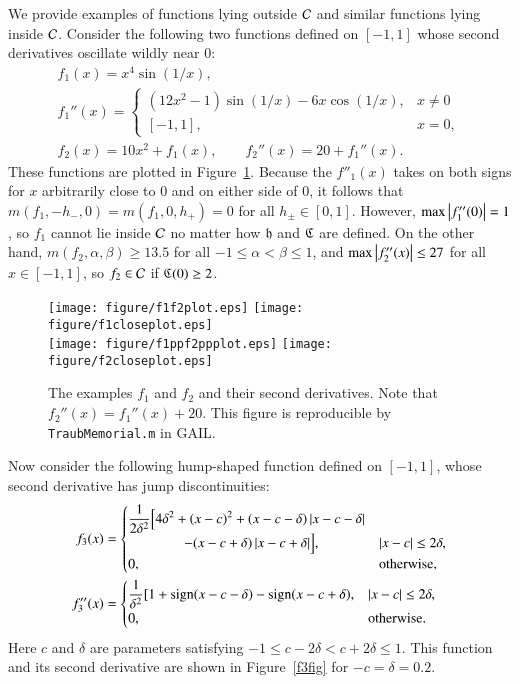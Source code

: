 \documentclass[review]{elsarticle}
\theoremstyle{definition}
\begin{document}
We provide examples of functions lying outside $\mathcal{C}$ and similar functions lying
inside $\mathcal{C}$. Consider the following two functions defined on $[-1,1]$ whose
second derivatives oscillate wildly near $0$:
\begin{gather*}
f_1(x) = x^4 \sin(1/x), \\
 f_1''(x) = \begin{cases} (12x^2 - 1) \sin(1/x) -6 x \cos(1/x), & x \ne 0 \\
 [-1,1], & x = 0, \end{cases} \\
f_2(x) = 10  x^2 + f_1(x), \qquad f_2''(x) = 20+ f_1''(x).
\end{gather*}
These functions are plotted in Figure~\ref{f1f2fig}. Because the $f''_1(x)$
takes on both signs for $x$ arbitrarily close to $0$ and on either side of $0$,
it follows that  $m(f_1,-h_-,0) = m(f_1,0,h_+) = 0$ for all $h_\pm \in [0,1]$.
However, $\max\left \lvert f''_1(0) \right \rvert = 1$, so $f_1$ cannot lie inside
$\mathcal{C}$ no matter how $\mathfrak{h}$ and $\mathfrak{C}$ are defined. On the other hand,
$m(f_2,\alpha, \beta) \ge 13.5$ for all $-1 \le \alpha < \beta \le 1$, and
$\max \left \lvert f''_2(x) \right \rvert \le 27$ for all $x \in [-1,1]$, so $f_2 \in
\mathcal{C}$ if $\mathfrak{C}(0) \ge 2$.

\begin{figure}[t]
\centering
\texttt{[image: figure/f1f2plot.eps]} \quad
\texttt{[image: figure/f1closeplot.eps]} \\
\texttt{[image: figure/f1ppf2ppplot.eps]} \quad
\texttt{[image: figure/f2closeplot.eps]}
\caption{The examples $f_1$ and $f_2$ and their second derivatives. Note that
$f_2''(x) = f_1''(x) + 20$. This figure is reproducible by {\tt TraubMemorial.m}
in GAIL.}
\label{f1f2fig}
\end{figure}

Now consider the following hump-shaped function defined on $[-1,1]$, whose
second derivative has jump discontinuities:
\begin{align} \label{f3def}
f_3(x) & = \begin{cases} \displaystyle
   \frac{1}{2\delta^2} \Bigl [4 \delta^2 + (x-c)^2 + (x-c-\delta)\left \lvert x-c-\delta \right \rvert
\\ \qquad \qquad
    - (x-c+\delta)\left \lvert x-c+\delta \right \rvert \Bigr ], & \left \lvert x-c \right \rvert \le 2\delta,
\\ 0, & \text{otherwise},
\end{cases} \\
\nonumber
f''_3(x) & =
\begin{cases} \displaystyle
    \frac{1}{\delta^2} [1 + \operatorname{sign}(x-c-\delta) - \operatorname{sign}(x-c+\delta), & \left \lvert x-c \right \rvert \le 2\delta,
\\ 0, & \text{otherwise}.
\end{cases}
\end{align}
Here $c$ and $\delta$ are parameters satisfying $-1 \le c-2 \delta < c+ 2\delta
\le 1$. This function and its second derivative are shown in Figure~\ref{f3fig}
for $-c=\delta = 0.2$.
\end{document}
